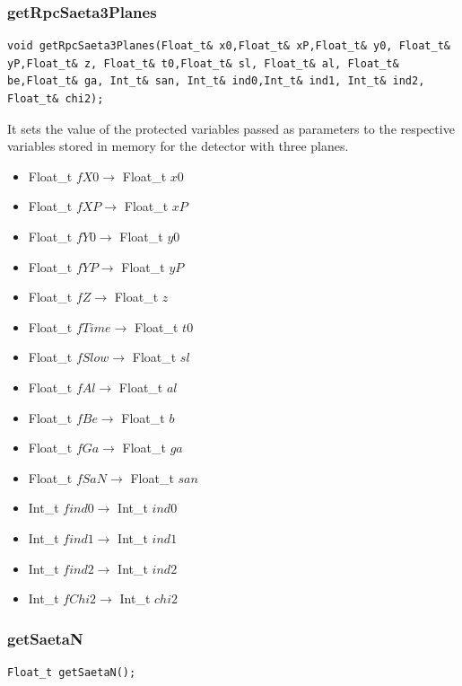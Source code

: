 \documentclass[a4paper]{book}
\begin{document}
\subsubsection{getRpcSaeta3Planes}

\begin{lstlisting}[style=customc]
void getRpcSaeta3Planes(Float_t& x0,Float_t& xP,Float_t& y0, Float_t& yP,Float_t& z, Float_t& t0,Float_t& sl, Float_t& al, Float_t& be,Float_t& ga, Int_t& san, Int_t& ind0,Int_t& ind1, Int_t& ind2, Float_t& chi2);
\end{lstlisting}

It sets the value of the protected variables passed as parameters to the respective variables stored in memory for the detector with three planes.

\begin{itemize}
	\item Float\_t $fX0 \rightarrow$ Float\_t $x0$
	\item Float\_t $fXP \rightarrow$ Float\_t $xP$
	\item Float\_t $fY0 \rightarrow$ Float\_t $y0$
	\item Float\_t $fYP \rightarrow$ Float\_t $yP$
	\item Float\_t $fZ \rightarrow$ Float\_t $z$
	\item Float\_t $fTime \rightarrow$ Float\_t $t0$
	\item Float\_t $fSlow \rightarrow$ Float\_t $sl$
	\item Float\_t $fAl \rightarrow$ Float\_t $al$
	\item Float\_t $fBe \rightarrow$ Float\_t $b$
	\item Float\_t $fGa \rightarrow$ Float\_t $ga$
	\item Float\_t $fSaN \rightarrow$ Float\_t $san$
	\item Int\_t $find0 \rightarrow$ Int\_t $ind0$
	\item Int\_t $find1 \rightarrow$ Int\_t $ind1$
	\item Int\_t $find2 \rightarrow$ Int\_t $ind2$
	\item Int\_t $fChi2 \rightarrow$ Int\_t $chi2$
\end{itemize}

\subsubsection{getSaetaN}

\begin{lstlisting}[style=customc]
Float_t getSaetaN();
\end{lstlisting}
\end{document}
